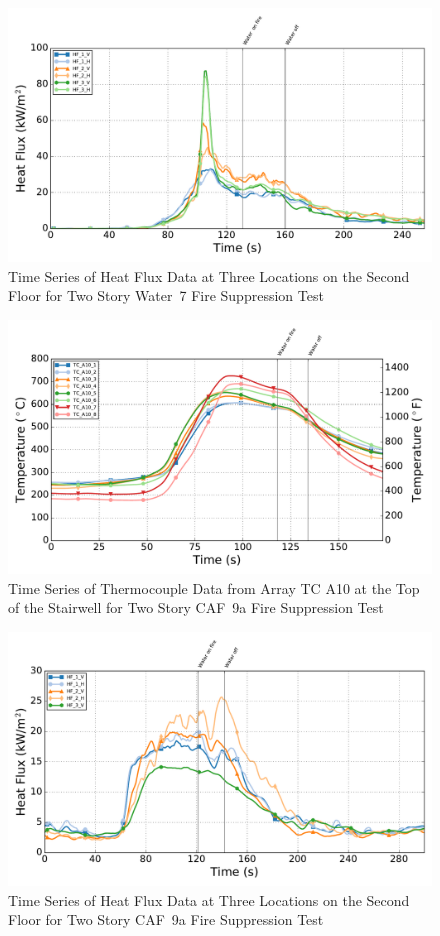 \documentclass[12pt,oneside]{book}
\begin{document}
\begin{figure}[!ht]
	\includegraphics[width=.85\columnwidth]{../Figures/Script_Figures/Test_39_West_061315_Heat_Flux}
	\caption{Time Series of Heat Flux Data at Three Locations on the Second Floor for Two Story Water~7 Fire Suppression Test}
	\label{fig:water7_hf}
\end{figure}

\begin{figure}[!ht]
	\includegraphics[width=.85\columnwidth]{../Figures/Script_Figures/Test_41_West_061415_TC_A10}
	\caption{Time Series of Thermocouple Data from Array TC A10 at the Top of the Stairwell for Two Story CAF~9a Fire Suppression Test}
	\label{fig:caf9a_tca10}
\end{figure}

\begin{figure}[!ht]
	\includegraphics[width=.85\columnwidth]{../Figures/Script_Figures/Test_41_West_061415_Heat_Flux}
	\caption{Time Series of Heat Flux Data at Three Locations on the Second Floor for Two Story CAF~9a Fire Suppression Test}
	\label{fig:caf9a_hf}
\end{figure}
\end{document}
